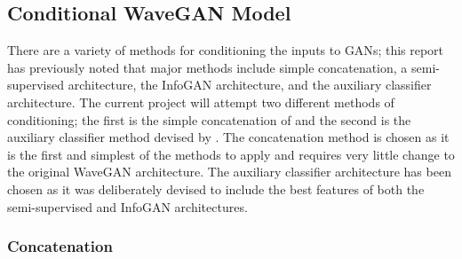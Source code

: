 \documentclass[a4paper, titlepage]{article}
\begin{document}
\subsection{Conditional WaveGAN Model}

There are a variety of methods for conditioning the inputs to \ac{GAN}s; this report has previously noted that major methods include simple concatenation, a semi-supervised architecture, the InfoGAN architecture, and the auxiliary classifier architecture.
The current project will attempt two different methods of conditioning; the first is the simple concatenation of \citeauthor{2014arXiv1411.1784M} and the second is the auxiliary classifier method devised by \citeauthor{2016arXiv161009585O}.
\newline
\newline
The concatenation method is chosen as it is the first and simplest of the methods to apply and requires very little change to the original WaveGAN architecture.
The auxiliary classifier architecture has been chosen as it was deliberately devised to include the best features of both the semi-supervised and InfoGAN architectures.

\subsubsection{Concatenation}
\end{document}
